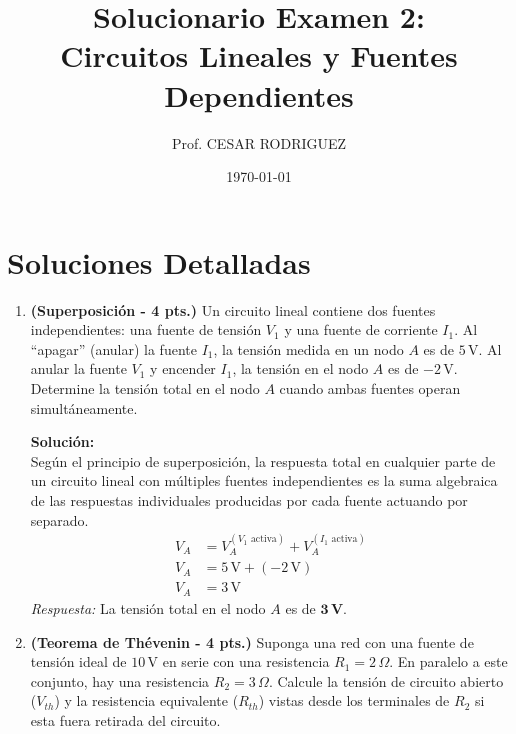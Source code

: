\documentclass[12pt, a4paper]{article}
\title{\textbf{Solucionario Examen 2: \\ Circuitos Lineales y Fuentes Dependientes}}
\author{Prof. CESAR RODRIGUEZ}
\date{\today}
\begin{document}
\maketitle

\section*{Soluciones Detalladas}

\begin{enumerate}[leftmargin=*, itemsep=2em]

    \item \textbf{(Superposición - 4 pts.)} Un circuito lineal contiene dos fuentes independientes: una fuente de tensión $V_1$ y una fuente de corriente $I_1$. Al ``apagar'' (anular) la fuente $I_1$, la tensión medida en un nodo $A$ es de $5\,\text{V}$. Al anular la fuente $V_1$ y encender $I_1$, la tensión en el nodo $A$ es de $-2\,\text{V}$. Determine la tensión total en el nodo $A$ cuando ambas fuentes operan simultáneamente.
    
    \textbf{Solución:} \\
    Según el principio de superposición, la respuesta total en cualquier parte de un circuito lineal con múltiples fuentes independientes es la suma algebraica de las respuestas individuales producidas por cada fuente actuando por separado.
    \begin{align*}
        V_{A} &= V_{A}^{(V_1 \text{ activa})} + V_{A}^{(I_1 \text{ activa})} \\
        V_{A} &= 5\,\text{V} + (-2\,\text{V}) \\
        V_{A} &= 3\,\text{V}
    \end{align*}
    \textit{Respuesta:} La tensión total en el nodo $A$ es de $\mathbf{3\,\text{V}}$.

    \item \textbf{(Teorema de Thévenin - 4 pts.)} Suponga una red con una fuente de tensión ideal de $10\,\text{V}$ en serie con una resistencia $R_1 = 2\,\Omega$. En paralelo a este conjunto, hay una resistencia $R_2 = 3\,\Omega$. Calcule la tensión de circuito abierto ($V_{th}$) y la resistencia equivalente ($R_{th}$) vistas desde los terminales de $R_2$ si esta fuera retirada del circuito.


\end{enumerate}
\end{document}
